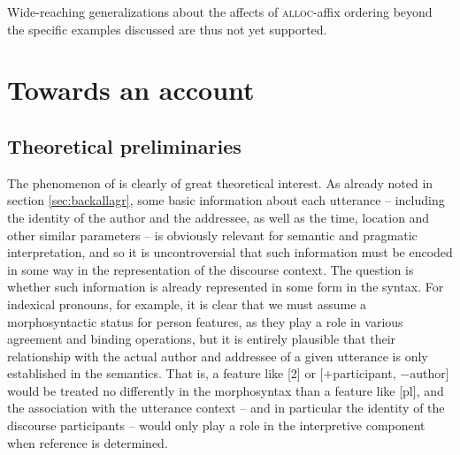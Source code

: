 \documentclass[output=paper, modfonts, nonflat]{langsci/langscibook}
\begin{document}
\ea\label{coffee}
  \z
\z
%
Wide-reaching generalizations about the affects of \textsc{alloc}-affix
ordering beyond the specific examples discussed are thus not yet
supported.

\section{Towards an account}
\label{sec:towards-an-account}

\subsection{Theoretical preliminaries}
\label{sec:theoprelim}

The phenomenon of \allagr{} is clearly of great theoretical
interest. As already noted in section \ref{sec:backallagr}, some basic
information about each utterance -- including the identity of the
author and the addressee, as well as the time, location and other
similar parameters -- is obviously relevant for semantic and
pragmatic interpretation, and so it is uncontroversial that such
information must be encoded in some way in the representation of the
discourse context. The question is whether such information is already
represented in some form in the syntax. For indexical pronouns, for
example, it is clear that we must assume a morphosyntactic status for
person features, as they play a role in various agreement and binding
operations, but it is entirely plausible that their relationship with
the actual author and addressee of a given utterance is only
established in the semantics. That is, a feature like [2] or
[$+$participant, $-$author] would be treated no differently in the
morphosyntax than a feature like [pl], and the association with the
utterance context -- and in particular the identity of the discourse
participants -- would only play a role in the interpretive component
when reference is determined.
\end{document}
